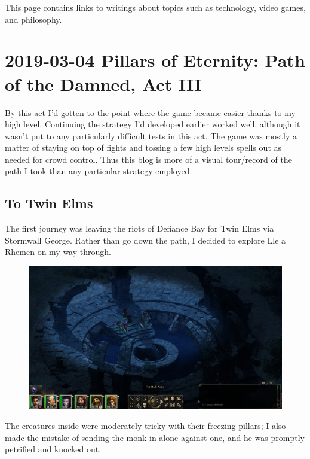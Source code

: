 \documentclass{article}
\begin{document}
This page contains links to writings about topics such as technology, video games, and philosophy.

\tableofchildlinks*

\section{2019-03-04 Pillars of Eternity: Path of the Damned, Act III}
By this act I'd gotten to the point where the game became easier thanks to my high level.  Continuing the strategy I'd developed earlier worked well, although it wasn't put to any particularly difficult tests in this act.  The game was mostly a matter of staying on top of fights and tossing a few high levels spells out as needed for crowd control.  Thus this blog is more of a visual tour/record of the path I took than any particular strategy employed.

\subsection{To Twin Elms}
The first journey was leaving the riots of Defiance Bay for Twin Elms via Stormwall George.  Rather than go down the path, I decided to explore Lle a Rhemen on my way through.

\begin{figure}
\includegraphics[scale=0.33]{files/blog/2019_03_04_pillars_of_eternity_path_of_the_damned_act_iii/2019_03_04_llearhemen_entrance.jpg}
\end{figure}

The creatures inside were moderately tricky with their freezing pillars; I also made the mistake of sending the monk in alone against one, and he was promptly petrified and knocked out.
\end{document}
